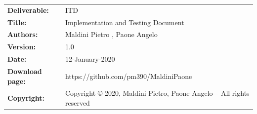 \begin{table}[h!]
\begin{tabu} to \textwidth { X[0.3,r,p] X[0.7,l,p] }
\hline

\textbf{Deliverable:} & ITD\\
\textbf{Title:} & Implementation and Testing Document \\
\textbf{Authors:} & Maldini Pietro , Paone Angelo \\
\textbf{Version:} & 1.0 \\ 
\textbf{Date:} & 12-January-2020 \\
\textbf{Download page:} & https://github.com/pm390/MaldiniPaone\\
\textbf{Copyright:} & Copyright © 2020, Maldini Pietro, Paone Angelo – All rights reserved \\
\hline
\end{tabu}
\end{table}




\setcounter{page}{2}


\newpage
{}
\tableofcontents


\clearpage
{}
\label{sect:introduction}


\clearpage
{}
\label{sect:Requirements and Functions}


\clearpage
{}
\label{sect:Development Choices}



